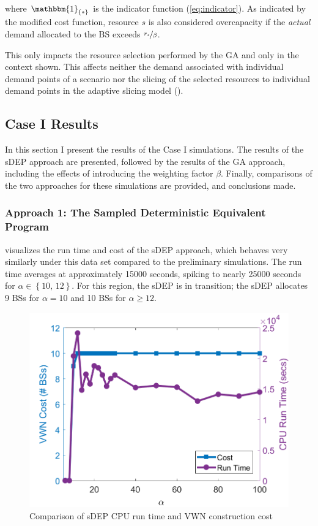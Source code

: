 \documentclass[12pt,dvipsnames]{report}
\newcommand{\ind}[1]{\mathbbm{1}_{\left\{ #1 \right\}}}
\begin{document}
\noindent where $\ind{*}$ is the indicator function (\cref{eq:indicator}).  As indicated by the modified cost function, resource $s$ is also considered overcapacity if the \emph{actual} demand allocated to the BS exceeds $\nicefrac{r_s}{\beta}$.

This only impacts the resource selection performed by the GA and only in the context shown.  This affects neither the demand associated with individual demand points of a scenario nor the slicing of the selected resources to individual demand points in the adaptive slicing model ().

\subsection{Case I Results} \label{subsec:caseI_results}

In this section I present the results of the Case I simulations.  The results of the sDEP approach are presented, followed by the results of the GA approach, including the effects of introducing the weighting factor $\beta$.  Finally, comparisons of the two approaches for these simulations are provided, and conclusions made.

\subsubsection{Approach 1: The Sampled Deterministic Equivalent Program}

 visualizes the run time and cost of the sDEP approach, which behaves very similarly under this data set compared to the preliminary simulations.  The run time averages at approximately 15000 seconds, spiking to nearly 25000 seconds for $\alpha \in \left\{ 10,\, 12 \right\}$.  For this region, the sDEP is in transition; the sDEP allocates 9 BSs for $\alpha = 10$ and 10 BSs for $\alpha \geq 12$.

\begin{figure}[htp]
	\centering
	\includegraphics[height=0.4\textheight]{Figures/CaseI_sDEPComparisonCostRuntime}
	\caption[Comparison of sDEP approach run time and costs for Case I simulations]{Comparison of sDEP CPU run time and VWN construction cost}
	\label{fig:CaseI_sDEPComparisonCostRunTime}
\end{figure}
\end{document}
